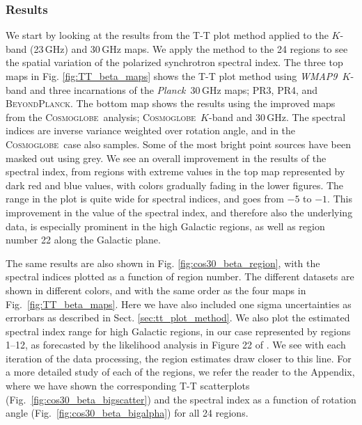\documentclass[twocolumn]{../../common/aa}
\def\WMAPnine{\emph{WMAP9}}
\def\Planck{\emph{Planck}}
\newcommand{\bp}{\textsc{BeyondPlanck}}
\newcommand{\cosmoglobe}{\textsc{Cosmoglobe}}
\begin{document}
\subsubsection{Results}
\label{sec:tt_plot_results}

We start by looking at the results from the T-T plot method applied to the $K$-band (23\,GHz) and 30\,GHz maps. We apply the method to the 24 regions to see the spatial variation of the polarized synchrotron spectral index. The three top maps in Fig. \ref{fig:TT_beta_maps} shows the T-T plot method using \WMAPnine\ $K$-band and three incarnations of the \Planck\ 30\,GHz maps; PR3, PR4, and \bp. The bottom map shows the results using the improved maps from the \cosmoglobe\ analysis; \cosmoglobe\ $K$-band and 30\,GHz. The spectral indices are inverse variance weighted over rotation angle, and in the \cosmoglobe\ case also samples. Some of the most bright point sources have been masked out using grey. We see an overall improvement in the results of the spectral index, from regions with extreme values in the top map represented by dark red and blue values, with colors gradually fading in the lower figures. The range in the plot is quite wide for spectral indices, and goes from $-5$ to $-1$. This improvement in the value of the spectral index, and therefore also the underlying data, is especially prominent in the high Galactic regions, as well as region  number 22 along the Galactic plane.

The same results are also shown in Fig. \ref{fig:cos30_beta_region}, with the spectral indices plotted as a function of region number. The different datasets are shown in different colors, and with the same order as the four maps in Fig.~\ref{fig:TT_beta_maps}. Here we have also included one sigma uncertainties as errorbars as described in Sect. \ref{sec:tt_plot_method}. We also plot the estimated spectral index range for high Galactic regions, in our case represented by regions 1--12, as forecasted by the likelihood analysis in Figure 22 of \citet{planck2016-l05}. We see with each iteration of the data processing, the region estimates draw closer to this line.
For a more detailed study of each of the regions, we refer the reader to the Appendix, where we have shown the corresponding T-T scatterplots (Fig.~\ref{fig:cos30_beta_bigscatter}) and the spectral index as a function of rotation angle (Fig.~\ref{fig:cos30_beta_bigalpha}) for all 24 regions.
\end{document}
